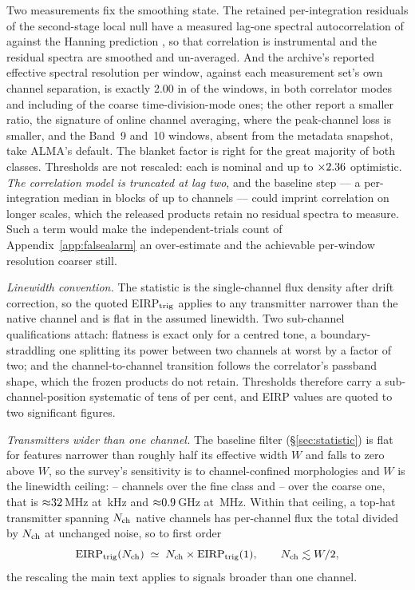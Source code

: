 Two measurements fix the smoothing state. The retained per-integration
residuals of the second-stage local null have a measured lag-one spectral
autocorrelation of \LNLagOne{} against the Hanning prediction \HanRhoOne, so
that correlation is instrumental and the residual spectra are smoothed and
un-averaged. And the archive's reported effective spectral resolution per
window, against each measurement set's own channel separation, is exactly
2.00 in \NHanTwo{} of the \NHanKnown{} windows, in both correlator modes and
including \NHanTwoCoarse{} of the \NCoarseHanKnown{} coarse
time-division-mode ones; the other \NHanOther{} report a smaller ratio, the
signature of online channel averaging, where the peak-channel loss is
smaller, and the \NNoArchRes{} Band~9 and~10 windows, absent from the
metadata snapshot, take ALMA's default. The blanket factor is right for the
great majority of both classes. Thresholds are not rescaled: each is nominal
and up to $\times2.36$ optimistic. \emph{The correlation model is
truncated at lag two}, and the baseline step --- a per-integration median in
blocks of up to \MedWin{} channels --- could imprint correlation on longer
scales, which the released products retain no residual spectra to measure.
Such a term would make the independent-trials count of
Appendix~\ref{app:falsealarm} an over-estimate and the achievable per-window
resolution coarser still.

\emph{Linewidth convention.} The statistic is the single-channel flux
density after drift correction, so the quoted EIRP$_{\rm trig}$ applies to
any transmitter narrower than the native channel and is flat in the assumed
linewidth. Two sub-channel qualifications attach: flatness is exact only for
a centred tone, a boundary-straddling one splitting its power between two
channels at worst by a factor of two; and the channel-to-channel transition
follows the correlator's passband shape, which the frozen products do not
retain. Thresholds therefore carry a sub-channel-position systematic of tens
of per cent, and EIRP values are quoted to two significant figures.

\emph{Transmitters wider than one channel.} The baseline filter
(\S\ref{sec:statistic}) is flat for features narrower than roughly half its
effective width $W$ and falls to zero above $W$, so the survey's sensitivity
is to channel-confined morphologies and $W$ is the linewidth ceiling:
\MedWinFineLo--\MedWinFineHi{} channels over the fine class and
\MedWinCoarseLo--\MedWinCoarseHi{} over the coarse one, that is
${\approx}32$\,MHz at \ChanFineKHz\,kHz and
${\approx}0.9$\,GHz at \ChanCoarseMHz\,MHz. Within that
ceiling, a top-hat transmitter spanning $N_{\rm ch}$ native channels has
per-channel flux the total divided by $N_{\rm ch}$ at unchanged noise, so to
first order
\begin{equation}
\mathrm{EIRP}_{\rm trig}(N_{\rm ch}) \;\simeq\; N_{\rm ch}\times
\mathrm{EIRP}_{\rm trig}(1), \qquad N_{\rm ch} \lesssim W/2,
\end{equation}
the rescaling the main text applies to signals broader than one channel.

